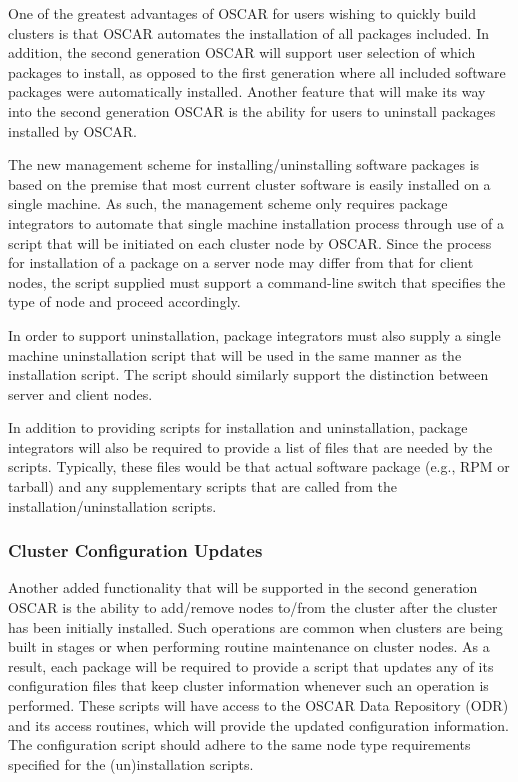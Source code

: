 One of the greatest advantages of OSCAR for users wishing to quickly
build clusters is that OSCAR automates the installation of all
packages included. In addition, the second generation OSCAR will
support user selection of which packages to install, as opposed to the
first generation where all included software packages were
automatically installed. Another feature that will make its way into
the second generation OSCAR is the ability for users to uninstall
packages installed by OSCAR.

The new management scheme for installing/uninstalling software
packages is based on the premise that most current cluster software is
easily installed on a single machine. As such, the management scheme
only requires package integrators to automate that single machine
installation process through use of a script that will be initiated on
each cluster node by OSCAR. Since the process for installation of a
package on a server node may differ from that for client nodes, the
script supplied must support a command-line switch that specifies the
type of node and proceed accordingly.

In order to support uninstallation, package integrators must also
supply a single machine uninstallation script that will be used in the
same manner as the installation script. The script should similarly
support the distinction between server and client nodes.

In addition to providing scripts for installation and uninstallation,
package integrators will also be required to provide a list of files
that are needed by the scripts.  Typically, these files would be that
actual software package (e.g., RPM or tarball) and any supplementary
scripts that are called from the installation/uninstallation scripts.

\subsubsection{Cluster Configuration Updates}

Another added functionality that will be supported in the second
generation OSCAR is the ability to add/remove nodes to/from the
cluster after the cluster has been initially installed. Such
operations are common when clusters are being built in stages or when
performing routine maintenance on cluster nodes. As a result, each
package will be required to provide a script that updates any of its
configuration files that keep cluster information whenever such an
operation is performed. These scripts will have access to the OSCAR
Data Repository (ODR) and its access routines, which will provide the
updated configuration information. The configuration script should
adhere to the same node type requirements specified for the
(un)installation scripts.

